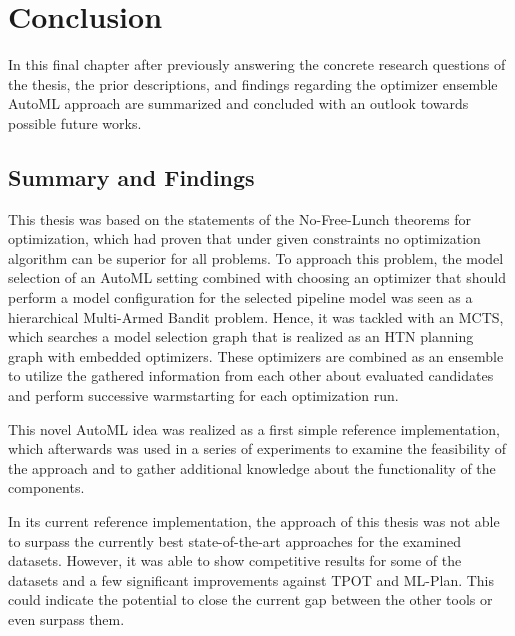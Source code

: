 %
\chapter{Conclusion}
\label{sec:conclusion}
In this final chapter after previously answering the concrete research questions of the thesis, the prior descriptions, and findings regarding the optimizer ensemble AutoML approach are summarized and concluded with an outlook towards possible future works.

\section{Summary and Findings}
\label{sec:conclusion:summary}
This thesis was based on the statements of the No-Free-Lunch theorems for optimization, which had proven that under given constraints no optimization algorithm can be superior for all problems.
To approach this problem, the model selection of an AutoML setting combined with choosing an optimizer that should perform a model configuration for the selected pipeline model was seen as a hierarchical Multi-Armed Bandit problem.
Hence, it was tackled with an MCTS, which searches a model selection graph that is realized as an HTN planning graph with embedded optimizers.
These optimizers are combined as an ensemble to utilize the gathered information from each other about evaluated candidates and perform successive warmstarting for each optimization run.

This novel AutoML idea was realized as a first simple reference implementation, which afterwards was used in a series of experiments to examine the feasibility of the approach and to gather additional knowledge about the functionality of the components.

In its current reference implementation, the approach of this thesis was not able to surpass the currently best state-of-the-art approaches for the examined datasets.
However, it was able to show competitive results for some of the datasets and a few significant improvements against TPOT and ML-Plan.
This could indicate the potential to close the current gap between the other tools or even surpass them.

